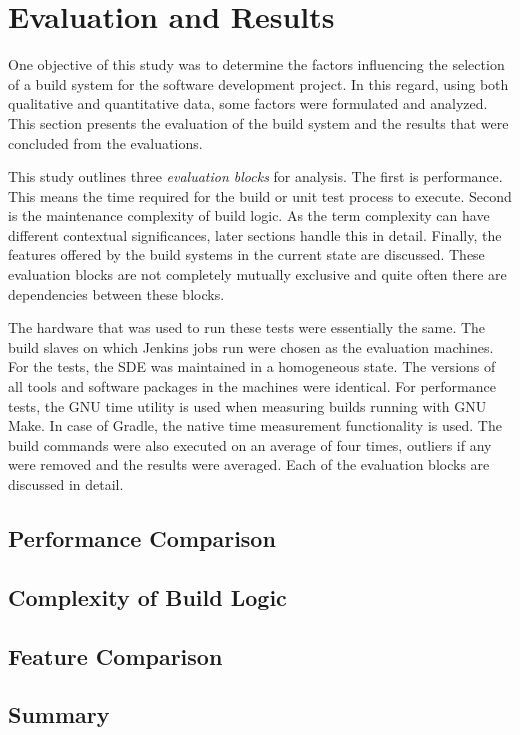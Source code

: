 \documentclass[12pt, a4paper, titlepage]{scrartcl}
\begin{document}
\section{Evaluation and Results}
\par One objective of this study was to determine the factors influencing the selection of a build system for the software development project. In this regard, using both qualitative and quantitative data, some factors were formulated and analyzed. This section presents the evaluation of the build system and the results that were concluded from the evaluations. 
\par This study outlines three \emph{evaluation blocks} for analysis. The first is performance. This means the time required for the build or unit test process to execute. Second is the maintenance complexity of build logic. As the term complexity can have different contextual significances, later sections handle this in detail. Finally, the features offered by the build systems in the current state are discussed. These evaluation blocks are not completely mutually exclusive and quite often there are dependencies between these blocks. 
\par The hardware that was used to run these tests were essentially the same. The build slaves on which Jenkins jobs run were chosen as the evaluation machines. For the tests, the SDE was maintained in a homogeneous state. The versions of all tools and software packages in the machines were identical. For performance tests, the GNU time utility is used when measuring builds running with GNU Make. In case of Gradle, the native time measurement functionality is used. The build commands were also executed on an average of four times, outliers if any were removed and the results were averaged. Each of the evaluation blocks are discussed in detail. 
\subsection{Performance Comparison}
\subsection{Complexity of Build Logic}
\subsection{Feature Comparison}
\subsection{Summary}
\end{document}
